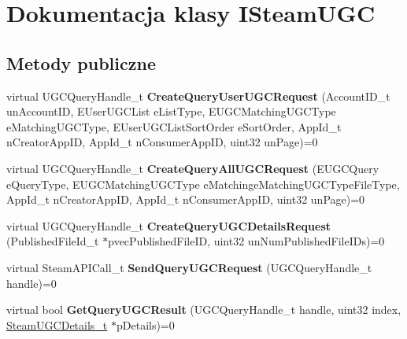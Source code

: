 \hypertarget{class_i_steam_u_g_c}{}\section{Dokumentacja klasy I\+Steam\+U\+GC}
\label{class_i_steam_u_g_c}
\subsection*{Metody publiczne}
\begin{DoxyCompactItemize}
\item 
\mbox{\label{class_i_steam_u_g_c_a701e96d732942eab2ebc3d86965b98db}} 
virtual U\+G\+C\+Query\+Handle\+\_\+t {\bfseries Create\+Query\+User\+U\+G\+C\+Request} (Account\+I\+D\+\_\+t un\+Account\+ID, E\+User\+U\+G\+C\+List e\+List\+Type, E\+U\+G\+C\+Matching\+U\+G\+C\+Type e\+Matching\+U\+G\+C\+Type, E\+User\+U\+G\+C\+List\+Sort\+Order e\+Sort\+Order, App\+Id\+\_\+t n\+Creator\+App\+ID, App\+Id\+\_\+t n\+Consumer\+App\+ID, uint32 un\+Page)=0
\item 
\mbox{\label{class_i_steam_u_g_c_ab7bba235c8ef89d8d7d3a98f0ed2e64e}} 
virtual U\+G\+C\+Query\+Handle\+\_\+t {\bfseries Create\+Query\+All\+U\+G\+C\+Request} (E\+U\+G\+C\+Query e\+Query\+Type, E\+U\+G\+C\+Matching\+U\+G\+C\+Type e\+Matchinge\+Matching\+U\+G\+C\+Type\+File\+Type, App\+Id\+\_\+t n\+Creator\+App\+ID, App\+Id\+\_\+t n\+Consumer\+App\+ID, uint32 un\+Page)=0
\item 
\mbox{\label{class_i_steam_u_g_c_ad369c4e6eecc09dfc76b494254d330f6}} 
virtual U\+G\+C\+Query\+Handle\+\_\+t {\bfseries Create\+Query\+U\+G\+C\+Details\+Request} (Published\+File\+Id\+\_\+t $\ast$pvec\+Published\+File\+ID, uint32 un\+Num\+Published\+File\+I\+Ds)=0
\item 
\mbox{\label{class_i_steam_u_g_c_ad3670cfa5bca882a679fb9bd339020f3}} 
virtual Steam\+A\+P\+I\+Call\+\_\+t {\bfseries Send\+Query\+U\+G\+C\+Request} (U\+G\+C\+Query\+Handle\+\_\+t handle)=0
\item 
\mbox{\label{class_i_steam_u_g_c_a1020425f4dfb254e253884390326dbe2}} 
virtual bool {\bfseries Get\+Query\+U\+G\+C\+Result} (U\+G\+C\+Query\+Handle\+\_\+t handle, uint32 index, \hyperlink{struct_steam_u_g_c_details__t}{Steam\+U\+G\+C\+Details\+\_\+t} $\ast$p\+Details)=0

\end{DoxyCompactItemize}
